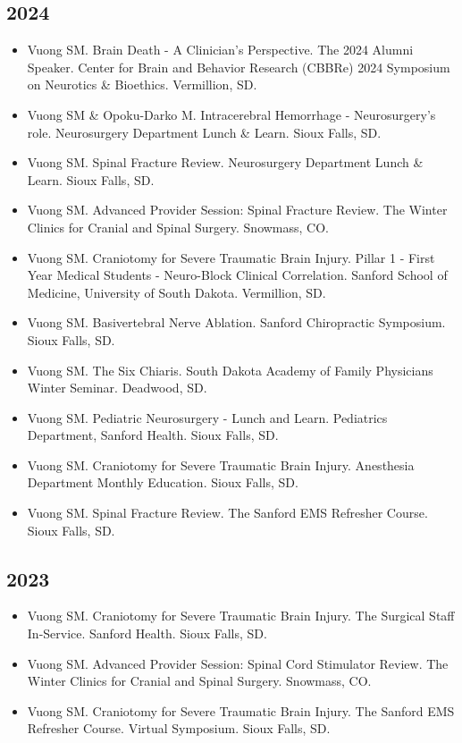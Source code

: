 \documentclass[11pt, a4paper]{article}
\begin{document}
\subsection{2024}
\begin{itemize}
  \setlength\itemindent{0.25em}
  \item Vuong SM. Brain Death - A Clinician's Perspective. The 2024 Alumni Speaker. Center for Brain and Behavior Research (CBBRe) 2024 Symposium on Neurotics \& Bioethics. Vermillion, SD.
  \item Vuong SM \& Opoku-Darko M. Intracerebral Hemorrhage - Neurosurgery's role. Neurosurgery Department Lunch \& Learn. Sioux Falls, SD.
  \item Vuong SM. Spinal Fracture Review. Neurosurgery Department Lunch \& Learn. Sioux Falls, SD.
  \item Vuong SM. Advanced Provider Session: Spinal Fracture Review. The Winter Clinics for Cranial and Spinal Surgery. Snowmass, CO.
  \item Vuong SM. Craniotomy for Severe Traumatic Brain Injury. Pillar 1 - First Year Medical Students - Neuro-Block Clinical Correlation. Sanford School of Medicine, University of South Dakota. Vermillion, SD.
  \item Vuong SM. Basivertebral Nerve Ablation. Sanford Chiropractic Symposium. Sioux Falls, SD.
  \item Vuong SM. The Six Chiaris. South Dakota Academy of Family Physicians Winter Seminar. Deadwood, SD.
  \item Vuong SM. Pediatric Neurosurgery - Lunch and Learn. Pediatrics Department, Sanford Health. Sioux Falls, SD.
  \item Vuong SM. Craniotomy for Severe Traumatic Brain Injury. Anesthesia Department Monthly Education. Sioux Falls, SD.
  \item Vuong SM. Spinal Fracture Review. The Sanford EMS Refresher Course. Sioux Falls, SD.
\end{itemize}

\subsection{2023}
\begin{itemize}
  \setlength\itemindent{0.25em}
  \item Vuong SM. Craniotomy for Severe Traumatic Brain Injury. The Surgical Staff In-Service. Sanford Health. Sioux Falls, SD.
  \item Vuong SM. Advanced Provider Session: Spinal Cord Stimulator Review. The Winter Clinics for Cranial and Spinal Surgery. Snowmass, CO.
  \item Vuong SM. Craniotomy for Severe Traumatic Brain Injury. The Sanford EMS Refresher Course. Virtual Symposium. Sioux Falls, SD.
\end{itemize}
\end{document}
